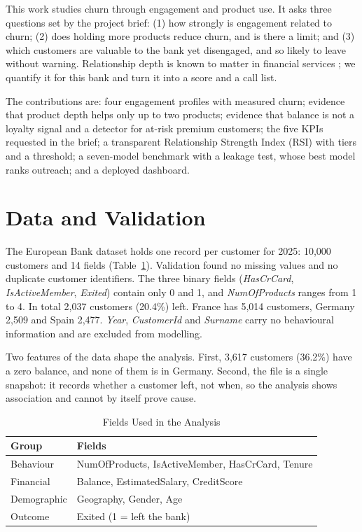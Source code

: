 \documentclass[10pt,twocolumn,letterpaper]{article}
\begin{document}
This work studies churn through engagement and product use. It asks three questions set by the project brief: (1) how strongly is engagement related to churn; (2) does holding more products reduce churn, and is there a limit; and (3) which customers are valuable to the bank yet disengaged, and so likely to leave without warning. Relationship depth is known to matter in financial services \cite{verhoef,vandenpoel,kamakura}; we quantify it for this bank and turn it into a score and a call list.

The contributions are: four engagement profiles with measured churn; evidence that product depth helps only up to two products; evidence that balance is not a loyalty signal and a detector for at-risk premium customers; the five KPIs requested in the brief; a transparent Relationship Strength Index (RSI) with tiers and a threshold; a seven-model benchmark with a leakage test, whose best model ranks outreach; and a deployed dashboard.

\section{Data and Validation}
The European Bank dataset holds one record per customer for 2025: 10,000 customers and 14 fields (Table~\ref{tab:data}). Validation found no missing values and no duplicate customer identifiers. The three binary fields (\textit{HasCrCard}, \textit{IsActiveMember}, \textit{Exited}) contain only 0 and 1, and \textit{NumOfProducts} ranges from 1 to 4. In total 2,037 customers (20.4\%) left. France has 5,014 customers, Germany 2,509 and Spain 2,477. \textit{Year}, \textit{CustomerId} and \textit{Surname} carry no behavioural information and are excluded from modelling.

Two features of the data shape the analysis. First, 3,617 customers (36.2\%) have a zero balance, and none of them is in Germany. Second, the file is a single snapshot: it records whether a customer left, not when, so the analysis shows association and cannot by itself prove cause.

\begin{table}[t]
\caption{Fields Used in the Analysis}\label{tab:data}
\centering\footnotesize
\begin{tabularx}{\columnwidth}{@{}lX@{}}
\toprule
Group & Fields\\
\midrule
Behaviour & NumOfProducts, IsActiveMember, HasCrCard, Tenure\\
Financial & Balance, EstimatedSalary, CreditScore\\
Demographic & Geography, Gender, Age\\
Outcome & Exited (1 = left the bank)\\
\bottomrule
\end{tabularx}
\end{table}
\end{document}
